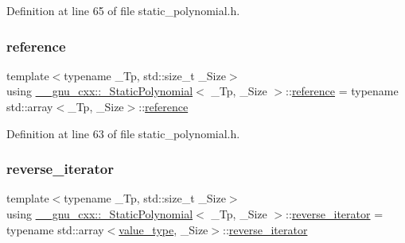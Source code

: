 Definition at line 65 of file static\+\_\+polynomial.\+h.

\mbox{\label{class____gnu__cxx_1_1__StaticPolynomial_a2416b66d254edf3e7118a8fb1204403f}} 
\subsubsection{\texorpdfstring{reference}{reference}}
{\footnotesize\ttfamily template$<$typename \+\_\+\+Tp, std\+::size\+\_\+t \+\_\+\+Size$>$ \\
using \hyperlink{class____gnu__cxx_1_1__StaticPolynomial}{\+\_\+\+\_\+gnu\+\_\+cxx\+::\+\_\+\+Static\+Polynomial}$<$ \+\_\+\+Tp, \+\_\+\+Size $>$\+::\hyperlink{class____gnu__cxx_1_1__StaticPolynomial_a2416b66d254edf3e7118a8fb1204403f}{reference} =  typename std\+::array$<$\+\_\+\+Tp, \+\_\+\+Size$>$\+::\hyperlink{class____gnu__cxx_1_1__StaticPolynomial_a2416b66d254edf3e7118a8fb1204403f}{reference}}



Definition at line 63 of file static\+\_\+polynomial.\+h.

\mbox{\label{class____gnu__cxx_1_1__StaticPolynomial_a6313ff2d9e03c7911016595440c6a2ae}} 
\subsubsection{\texorpdfstring{reverse\+\_\+iterator}{reverse\_iterator}}
{\footnotesize\ttfamily template$<$typename \+\_\+\+Tp, std\+::size\+\_\+t \+\_\+\+Size$>$ \\
using \hyperlink{class____gnu__cxx_1_1__StaticPolynomial}{\+\_\+\+\_\+gnu\+\_\+cxx\+::\+\_\+\+Static\+Polynomial}$<$ \+\_\+\+Tp, \+\_\+\+Size $>$\+::\hyperlink{class____gnu__cxx_1_1__StaticPolynomial_a6313ff2d9e03c7911016595440c6a2ae}{reverse\+\_\+iterator} =  typename std\+::array$<$\hyperlink{class____gnu__cxx_1_1__StaticPolynomial_aad5f3d6d5876b6926b30724aeac649d6}{value\+\_\+type}, \+\_\+\+Size$>$\+::\hyperlink{class____gnu__cxx_1_1__StaticPolynomial_a6313ff2d9e03c7911016595440c6a2ae}{reverse\+\_\+iterator}}



